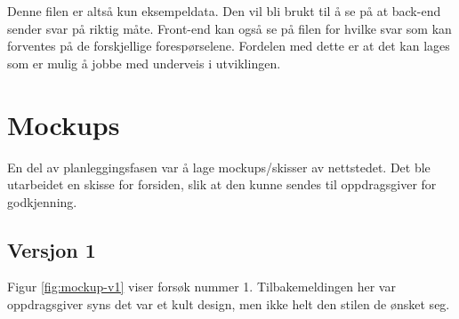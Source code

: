 Denne filen er altså kun eksempeldata. Den vil bli brukt til å se på at back-end sender svar på riktig måte. Front-end kan også se på filen for hvilke svar som kan forventes på de forskjellige forespørselene. Fordelen med dette er at det kan lages  som er mulig å jobbe med underveis i utviklingen.

\section{Mockups}
En del av planleggingsfasen var å lage mockups/skisser av nettstedet. Det ble utarbeidet en skisse for forsiden, slik at den kunne sendes til oppdragsgiver for godkjenning.

\subsection{Versjon 1}
Figur \ref{fig:mockup-v1} viser forsøk nummer 1. Tilbakemeldingen her var oppdragsgiver syns det var et kult design, men ikke helt den stilen de ønsket seg.

